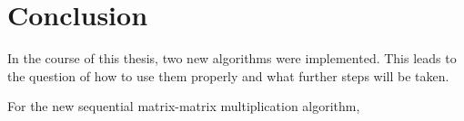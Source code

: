 \chapter*{Conclusion}

In the course of this thesis, two new algorithms were implemented. This leads to the question of how to use them properly and what further steps will be taken. 

For the new sequential matrix-matrix multiplication algorithm, 